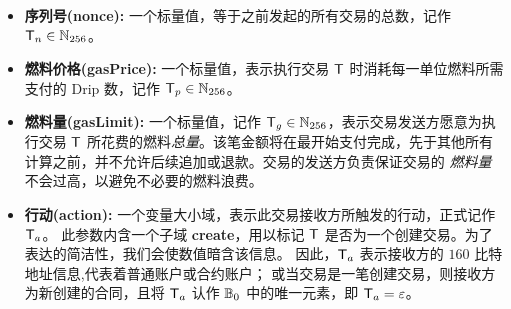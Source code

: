 \begin{itemize} [nosep]
	\item {\bf 序列号(nonce):} 一个标量值，等于之前发起的所有交易的总数，记作 $\textsf{T}_n \in\mathbb{N}_{256}$。

	\item {\bf 燃料价格(gasPrice):} 一个标量值，表示执行交易 $\textsf{T}$ 时消耗每一单位燃料所需支付的 Drip 数，记作 $\textsf{T}_p\in\mathbb{N}_{256}$。

	\item {\bf 燃料量(gasLimit):} 
	一个标量值，记作 $\textsf{T}_g\in\mathbb{N}_{256}$，表示交易发送方愿意为执行交易 $\textsf{T}$ 所花费的燃料\emph{总量}。该笔金额将在最开始支付完成，先于其他所有计算之前，并不允许后续追加或退款。交易的发送方负责保证交易的 \emph{燃料量} 不会过高，以避免不必要的燃料浪费。

	\item {\bf 行动(action):} 
	一个变量大小域，表示此交易接收方所触发的行动，正式记作 $\textsf{T}_a$。
	此参数内含一个子域 {\bf create}，用以标记 $\textsf{T}$ 是否为一个创建交易。为了表达的简洁性，我们会使数值暗含该信息。
	因此，$\textsf{T}_a$ 表示接收方的 $160$ 比特地址信息,代表着普通账户或合约账户； 
	或当交易是一笔创建交易，则接收方为新创建的合同，且将 $\textsf{T}_a$ 认作 $\mathbb{B}_0$ 中的唯一元素，即 $\textsf{T}_a = \mathbb{\varepsilon}$。


\end{itemize}
